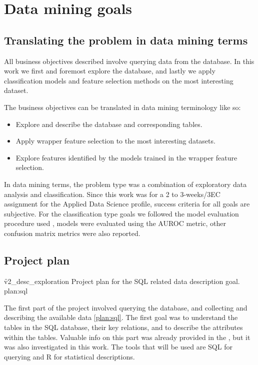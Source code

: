 \section{Data mining goals}

\subsection{Translating the problem in data mining terms}

All business objectives described involve querying data from the \flup database.
In this work we first and foremost explore the database, and lastly we apply classification models and feature selection methods on the most interesting dataset.

The business objectives can be translated in data mining terminology like so:
\begin{itemize}
        \item Explore and describe the database and corresponding tables.
        \item Apply wrapper feature selection to the most interesting datasets.
        \item Explore features identified by the models trained in the wrapper feature selection.
\end{itemize}

In data mining terms, the problem type was a combination of exploratory data analysis and classification.
Since this work was for a 2 to 3-weeks/3EC assignment for the Applied Data Science profile, success criteria for all goals are subjective.
For the classification type goals we followed the model evaluation procedure used \spaper, models were evaluated using the AUROC metric, other confusion matrix metrics were also reported.

\subsection{Project plan}

\f{v2_desc_exploration}
{Project plan for the SQL related data description goal.}
{plan:sql}

The first part of the project involved querying the database, and collecting and describing the available data \autoref{plan:sql}.
The first goal was to understand the tables in the SQL database, their key relations, and to describe the attributes within the tables.
Valuable info on this part was already provided in the \dpaper, but it was also investigated in this work.
The tools that will be used are SQL for querying and R for statistical descriptions.

